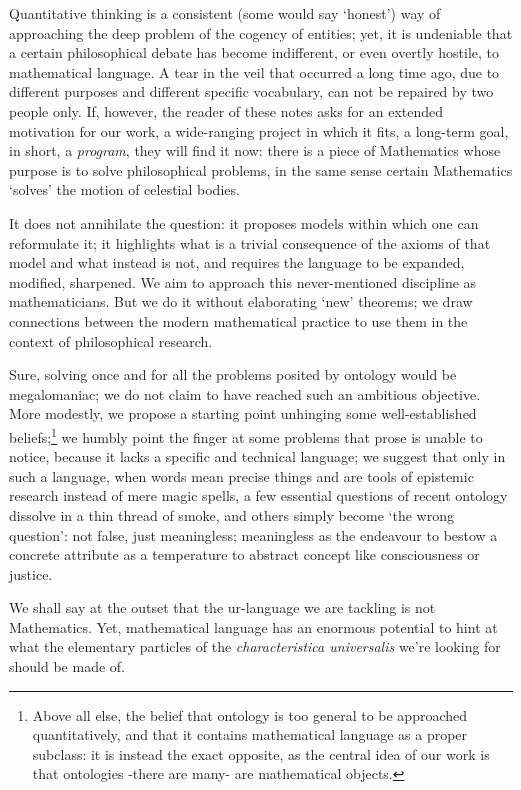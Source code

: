 Quantitative thinking is a consistent (some would say `honest') way of approaching the deep problem of the cogency of entities; yet, it is undeniable that a certain philosophical debate has become indifferent, or even overtly hostile, to mathematical language. A tear in the veil that occurred a long time ago, due to different purposes and different specific vocabulary, can not be repaired by two people only. If, however, the reader of these notes asks for an extended motivation for our work, a wide-ranging project in which it fits, a long-term goal, in short, a \emph{program}, they will find it now: there is a piece of Mathematics whose purpose is to solve philosophical problems, in the same sense certain Mathematics `solves' the motion of celestial bodies.

It does not annihilate the question: it proposes models within which one can reformulate it; it highlights what is a trivial consequence of the axioms of that model and what instead is not, and requires the language to be expanded, modified, sharpened. We aim to approach this never-mentioned discipline as mathematicians. But we do it without elaborating `new' theorems; we draw connections between the modern mathematical practice to use them in the context of philosophical research.

Sure, solving once and for all the problems posited by ontology would be megalomaniac; we do not claim to have reached such an ambitious objective. More modestly, we propose a starting point unhinging some well-established beliefs;\footnote{Above all else, the belief that ontology is too general to be approached quantitatively, and that it contains mathematical language as a proper subclass: it is instead the exact opposite, as the central idea of our work is that ontologies -there are many- are mathematical objects.} we humbly point the finger at some problems that prose is unable to notice, because it lacks a specific and technical language; we suggest that only in such a language, when words mean precise things and are tools of epistemic research instead of mere magic spells, a few essential questions of recent ontology dissolve in a thin thread of smoke, and others simply become `the wrong question': not false, just meaningless; meaningless as the endeavour to bestow a concrete attribute as a temperature to abstract concept like consciousness or justice.

We shall say at the outset that the ur-language we are tackling is not Mathematics. Yet, mathematical language has an enormous potential to hint at what the elementary particles of the \emph{characteristica universalis} we're looking for should be made of.

